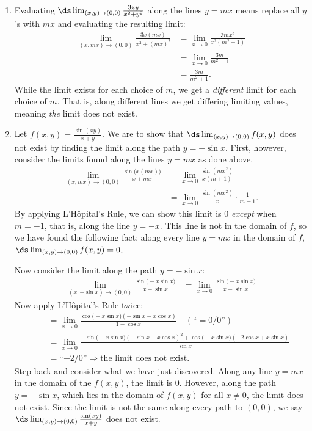 {\mbox{}\\[-1.5\baselineskip]\begin{enumerate}
	\item Evaluating $\ds \lim_{(x,y)\to (0,0)} \frac{3xy}{x^2+y^2}$ along the lines $y=mx$ means replace all $y$'s with $mx$ and evaluating the resulting limit:
	\begin{align*}
	\lim_{(x,mx)\to (0,0)} \frac{3x(mx)}{x^2+(mx)^2} &=\lim_{x\to 0} \frac{3mx^2}{x^2(m^2+1)}\\
				&= \lim_{x\to 0} \frac{3m}{m^2+1}\\
				&= \frac{3m}{m^2+1}.
	\end{align*}
	While the limit exists for each choice of $m$, we get a \emph{different} limit for each choice of $m$. That is, along different lines we get differing limiting values, meaning \emph{the} limit does not exist.
	
	\item		Let $f(x,y) = \frac{\sin(xy)}{x+y}$. We are to show that $\ds \lim_{(x,y)\to (0,0)} f(x,y)$ does not exist by finding the limit along the path $y=-\sin x$. First, however, consider the limits found along the lines $y=mx$ as done above.
	\begin{align*}
	\lim_{(x,mx)\to (0,0)} \frac{\sin\bigl(x(mx)\bigr)}{x+mx} &= \lim_{x\to 0} \frac{\sin (mx^2)}{x(m+1)} \\
	&= \lim_{x\to 0} \frac{\sin(mx^2)}{x}\cdot\frac1{m+1}.
	\end{align*}
	By applying L'H\^opital's Rule, we can show this limit is 0 \emph{except} when $m=-1$, that is, along the line $y=-x$. This line is not in the domain of $f$, so we have found the following fact: along every line $y=mx$ in the domain of $f$, $\ds \lim_{(x,y)\to(0,0)} f(x,y)=0$. %
	
	Now consider the limit along the path $y=-\sin x$:
	\begin{align*}
	\lim_{(x,-\sin x)\to (0,0)} \frac{\sin\bigl(-x\sin x\bigr)}{x-\sin x} &= \lim_{x\to0} \frac{\sin\bigl(-x\sin x\bigr)}{x-\sin x}
	\end{align*}
	Now apply L'H\^opital's Rule twice:
	\small
	\begin{align*}
	 \quad &= \lim_{x\to 0}\frac{\cos\bigl(-x\sin x\bigr)(-\sin x-x\cos x)}{1-\cos x} \quad \left(\text{``}= 0/0\text{''}\right)\\
	&= \lim_{x\to 0}\frac{-\sin\bigl(-x\sin x\bigr)(-\sin x-x\cos x)^2+\cos\bigl(-x\sin x\bigr)(-2\cos x+x\sin x)}{\sin x}\\
	&= \text{``$-2/0$''} \Rightarrow \text{the limit does not exist.}
	\end{align*}
	\normalsize
Step back and consider what we have just discovered. Along any line $y=mx$ in the domain of the $f(x,y)$, the limit is 0. However, along the path $y=-\sin x$, which lies in the domain of  $f(x,y)$ for all $x\neq 0$, the limit does not exist. Since the limit is not the same along every path to $(0,0)$, we say $\ds \lim_{(x,y)\to (0,0)}\frac{\sin(xy)}{x+y}$ does not exist.\eoehere
\end{enumerate}}

